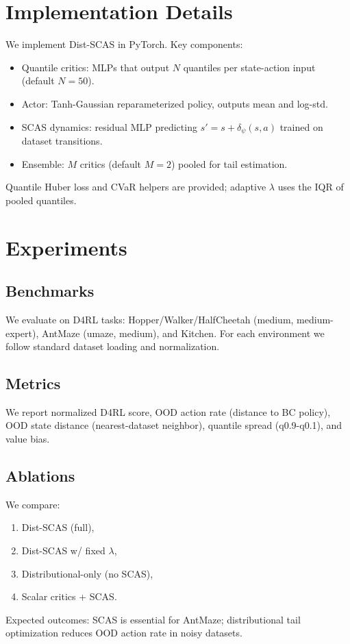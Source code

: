 \documentclass{article}
\begin{document}
\section{Implementation Details}
We implement Dist-SCAS in PyTorch. Key components:
\begin{itemize}
  \item Quantile critics: MLPs that output $N$ quantiles per state-action input (default $N=50$).
  \item Actor: Tanh-Gaussian reparameterized policy, outputs mean and log-std.
  \item SCAS dynamics: residual MLP predicting $s' = s + \delta_\psi(s,a)$ trained on dataset transitions.
  \item Ensemble: $M$ critics (default $M=2$) pooled for tail estimation.
\end{itemize}
Quantile Huber loss and CVaR helpers are provided; adaptive $\lambda$ uses the IQR of pooled quantiles.

\section{Experiments}
\subsection{Benchmarks}
We evaluate on D4RL tasks: Hopper/Walker/HalfCheetah (medium, medium-expert), AntMaze (umaze, medium), and Kitchen. For each environment we follow standard dataset loading and normalization.

\subsection{Metrics}
We report normalized D4RL score, OOD action rate (distance to BC policy), OOD state distance (nearest-dataset neighbor), quantile spread (q0.9-q0.1), and value bias.

\subsection{Ablations}
We compare:
\begin{enumerate}
  \item Dist-SCAS (full),
  \item Dist-SCAS w/ fixed $\lambda$,
  \item Distributional-only (no SCAS),
  \item Scalar critics + SCAS.
\end{enumerate}
Expected outcomes: SCAS is essential for AntMaze; distributional tail optimization reduces OOD action rate in noisy datasets.
\end{document}
